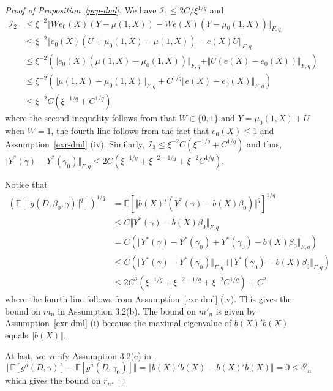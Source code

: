 \documentclass[
  12pt,
  12pt]{article}
\numberwithin{equation}{section}
\theoremstyle{definition}
\theoremstyle{plain}
\theoremstyle{plain}
\theoremstyle{remark}
\begin{document}
\begin{proof}[Proof of Proposition~\ref{prp-dml}]
We have \(\mathcal{I}_1 \leqslant 2C/\xi^{1/q}\) and \[
\begin{aligned}
\mathcal{I}_2 &\leqslant \xi^{-2}\Vert We_0(X)(Y - \mu(1, X)) - We(X)(Y - \mu_0(1, X)) \Vert_{F, q} \\
&\leqslant \xi^{-2} \Vert e_0(X)(U + \mu_0(1, X) - \mu(1, X)) - e(X)U \Vert_{F, q} \\
&\leqslant \xi^{-2} (\Vert e_0(X)(\mu(1, X) - \mu_0(1, X)) \Vert_{F, q} + \Vert U(e(X) - e_0(X)) \Vert_{F, q}) \\
&\leqslant \xi^{-2} (\Vert \mu(1, X) - \mu_0(1, X) \Vert_{F, q} + C^{1/q}\Vert e(X) - e_0(X) \Vert_{F, q}) \\
&\leqslant \xi^{-2}C(\xi^{-1/q} + C^{1/q})
\end{aligned}
\] where the second inequality follows from that \(W \in  \{0, 1\}\) and
\(Y = \mu_0(1, X) + U\) when \(W = 1\), the fourth line follows from the
fact that \(e_0(X) \leqslant 1\) and Assumption~\ref{exr-dml} (iv).
Similarly, \(\mathcal{I}_3 \leqslant \xi^{-2}C(\xi^{-1/q} + C^{1/q})\)
and thus,
\(\Vert Y^*(\gamma) - Y^*(\gamma_0) \Vert_{F, q} \leqslant 2C(\xi^{-1/q} + \xi^{-2 - 1/q} + \xi^{-2}C^{1/q})\).

Notice that \[\begin{aligned}
(\mathbb{E}[ \Vert g(D, \beta_0, \gamma) \Vert^{q}])^{1/q} &= \mathbb{E}[\Vert b(X)'(Y^*(\gamma) - b(X)\beta_0) \Vert^q]^{1/q} \\
&\leqslant C\Vert Y^*(\gamma) - b(X)\beta_0 \Vert_{F, q} \\
&= C(\Vert Y^*(\gamma) - Y^*(\gamma_0) + Y^*(\gamma_0) - b(X)\beta_0 \Vert_{F, q}) \\
&\leqslant C(\Vert Y^*(\gamma) - Y^*(\gamma_0) \Vert_{F, q} + \Vert Y^*(\gamma_0) - b(X)\beta_0 \Vert_{F, q}) \\
&\leqslant 2C^2(\xi^{-1/q} + \xi^{-2 - 1/q} + \xi^{-2}C^{1/q}) + C^2
\end{aligned}\] where the fourth line follows from
Assumption~\ref{exr-dml} (iv). This gives the bound on \(m_n\) in
Assumption 3.2(b). The bound on \(m'_n\) is given by
Assumption~\ref{exr-dml} (i) because the maximal eigenvalue of
\(b(X)'b(X)\) equals \(\Vert b(X) \Vert\).

At last, we verify Assumption 3.2(c) in \citet{chernozhukov2018double}.
\[
\Vert \mathbb{E}[g^a(D, \gamma)] - \mathbb{E}[g^a(D, \gamma_0)] \Vert = \Vert b(X)'b(X) - b(X)'b(X) \Vert = 0 \leqslant \delta'_n
\] which gives the bound on \(r_n\).


\end{proof}
\end{document}
